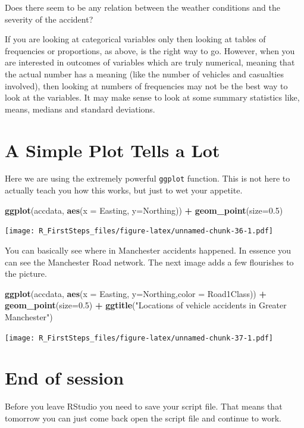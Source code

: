 \documentclass[
]{article}
\newenvironment{Shaded}{\begin{snugshade}}{\end{snugshade}}
\newcommand{\AttributeTok}[1]{\textcolor[rgb]{0.13,0.29,0.53}{#1}}
\newcommand{\FloatTok}[1]{\textcolor[rgb]{0.00,0.00,0.81}{#1}}
\newcommand{\FunctionTok}[1]{\textcolor[rgb]{0.13,0.29,0.53}{\textbf{#1}}}
\newcommand{\NormalTok}[1]{#1}
\newcommand{\SpecialCharTok}[1]{\textcolor[rgb]{0.81,0.36,0.00}{\textbf{#1}}}
\newcommand{\StringTok}[1]{\textcolor[rgb]{0.31,0.60,0.02}{#1}}
\begin{document}
Does there seem to be any relation between the weather conditions and
the severity of the accident?

If you are looking at categorical variables only then looking at tables
of frequencies or proportions, as above, is the right way to go.
However, when you are interested in outcomes of variables which are
truly numerical, meaning that the actual number has a meaning (like the
number of vehicles and casualties involved), then looking at numbers of
frequencies may not be the best way to look at the variables. It may
make sense to look at some summary statistics like, means, medians and
standard deviations.

\hypertarget{a-simple-plot-tells-a-lot}{%
\section{A Simple Plot Tells a Lot}\label{a-simple-plot-tells-a-lot}}

Here we are using the extremely powerful \texttt{ggplot} function. This
is not here to actually teach you how this works, but just to wet your
appetite.

\begin{Shaded}
\begin{Highlighting}[]
\FunctionTok{ggplot}\NormalTok{(accdata, }\FunctionTok{aes}\NormalTok{(}\AttributeTok{x =}\NormalTok{ Easting, }\AttributeTok{y=}\NormalTok{Northing)) }\SpecialCharTok{+} \FunctionTok{geom\_point}\NormalTok{(}\AttributeTok{size=}\FloatTok{0.5}\NormalTok{)}
\end{Highlighting}
\end{Shaded}

\texttt{[image: R\_FirstSteps\_files/figure-latex/unnamed-chunk-36-1.pdf]}

You can basically see where in Manchester accidents happened. In essence
you can see the Manchester Road network. The next image adds a few
flourishes to the picture.

\begin{Shaded}
\begin{Highlighting}[]
\FunctionTok{ggplot}\NormalTok{(accdata, }\FunctionTok{aes}\NormalTok{(}\AttributeTok{x =}\NormalTok{ Easting, }\AttributeTok{y=}\NormalTok{Northing,}\AttributeTok{color =}\NormalTok{ Road1Class)) }\SpecialCharTok{+} 
  \FunctionTok{geom\_point}\NormalTok{(}\AttributeTok{size=}\FloatTok{0.5}\NormalTok{) }\SpecialCharTok{+}
  \FunctionTok{ggtitle}\NormalTok{(}\StringTok{"Locations of vehicle accidents in Greater Manchester"}\NormalTok{)}
\end{Highlighting}
\end{Shaded}

\texttt{[image: R\_FirstSteps\_files/figure-latex/unnamed-chunk-37-1.pdf]}

\hypertarget{end-of-session}{%
\section{End of session}\label{end-of-session}}

Before you leave RStudio you need to save your script file. That means
that tomorrow you can just come back open the script file and continue
to work.
\end{document}
